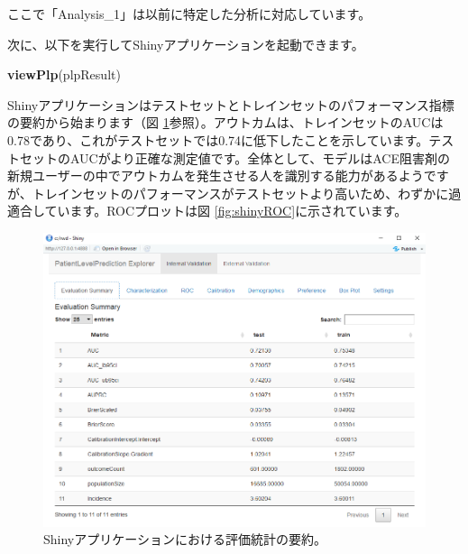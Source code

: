 \documentclass[
  11pt]{book}
\newenvironment{Shaded}{\begin{snugshade}}{\end{snugshade}}
\newcommand{\FunctionTok}[1]{\textcolor[rgb]{0.13,0.29,0.53}{\textbf{#1}}}
\newcommand{\NormalTok}[1]{#1}
\theoremstyle{definition}
\theoremstyle{definition}
\theoremstyle{definition}
\theoremstyle{definition}
\theoremstyle{remark}
\begin{document}
ここで「Analysis\_1」は以前に特定した分析に対応しています。

次に、以下を実行してShinyアプリケーションを起動できます。

\begin{Shaded}
\begin{Highlighting}[]
\FunctionTok{viewPlp}\NormalTok{(plpResult)}
\end{Highlighting}
\end{Shaded}

Shinyアプリケーションはテストセットとトレインセットのパフォーマンス指標の要約から始まります（図 \ref{fig:shinySummary}参照）。アウトカムは、トレインセットのAUCは0.78であり、これがテストセットでは0.74に低下したことを示しています。テストセットのAUCがより正確な測定値です。全体として、モデルはACE阻害剤の新規ユーザーの中でアウトカムを発生させる人を識別する能力があるようですが、トレインセットのパフォーマンスがテストセットより高いため、わずかに過適合しています。ROCプロットは図 \ref{fig:shinyROC}に示されています。

\begin{figure}
\includegraphics[width=1\linewidth]{images/PatientLevelPrediction/shinysummary} \caption{Shinyアプリケーションにおける評価統計の要約。}\label{fig:shinySummary}
\end{figure}
\end{document}
